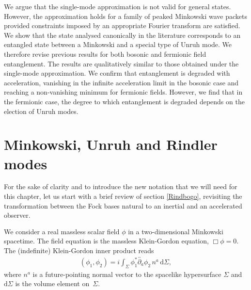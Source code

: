 We argue that the single-mode approximation is not valid for general states. However, the approximation holds for a family of peaked Minkowski wave packets provided constraints imposed by an appropriate Fourier transform are satisfied.  We show that the state analysed canonically in the literature corresponds to an entangled state between a Minkowski and a special type of Unruh mode. We therefore revise previous results for both bosonic and fermionic field entanglement.  The results are qualitatively similar to those obtained under the single-mode approximation.  We confirm that entanglement  is degraded with acceleration, vanishing in the infinite acceleration limit in the bosonic case and reaching a non-vanishing minimum for fermionic fields.  However, we find that in the fermionic case, the degree to which entanglement is degraded depends on the election of Unruh modes.


  

\section{Minkowski, Unruh and Rindler modes}\label{sec3m7}

For the sake of clarity and to introduce the new notation that we will need for this chapter, let us start with a brief review of section \ref{Rindbogo}, revisiting the transformation between the Fock bases natural to an inertial and an accelerated observer.

We consider a 
real massless scalar field $\phi$ in a 
two-dimensional Minkowski spacetime. 
The field equation is the massless 
Klein-Gordon equation, $\Box \phi=0$. 
The (indefinite) 
Klein-Gordon inner product reads 
\begin{align}
(\phi_1,\phi_2) = i \int_{\Sigma} \phi_1^* \overleftrightarrow{\partial_a}\phi_2 \, n^a  \, \text{d}\Sigma,
\end{align}
where $n^a$ is a future-pointing normal vector to the spacelike hypersurface $\Sigma$ and $\text{d}\Sigma$ 
is the volume element on~$\Sigma$. 

